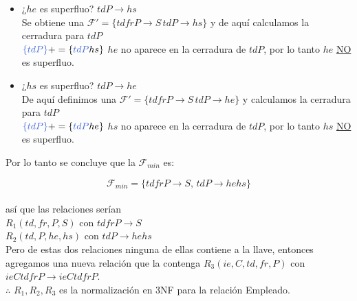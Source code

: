 \documentclass[10pt]{article}
\begin{document}
   	
   	\begin{itemize}
   		\item ¿$he$ es superfluo? $tdP \rightarrow hs$\\
   		Se obtiene una $\mathcal{F'} = \{tdfrP \rightarrow S \,tdP \rightarrow hs\}$ y de aquí calculamos la cerradura para $tdP$\\
   		$\textcolor{RoyalBlue}{\{tdP\}}+= \{\textcolor{RoyalBlue}{tdP}hs\}$
   		$he$ no aparece en la cerradura de $tdP$, por lo tanto $he$ \underline{NO} es superfluo.\\
   		
   		\item ¿$hs$ es superfluo? $tdP \rightarrow he$\\
   		De aquí definimos una $\mathcal{F'} = \{tdfrP \rightarrow S \,tdP \rightarrow he\}$ y calculamos la cerradura para $tdP$\\
   		$\textcolor{RoyalBlue}{\{tdP\}}+= \{\textcolor{RoyalBlue}{tdP}he\}$
   		$hs$ no aparece en la cerradura de $tdP$, por lo tanto $hs$ \underline{NO} es superfluo.\\
   		
   		
   		
   		 
   		
   		
   	\end{itemize}
   
   Por lo tanto se concluye que la $\mathcal{F}_{min}$ es:
   
   \[\mathcal{F}_{min}=\{ tdfrP \rightarrow S,\, tdP \rightarrow hehs\}\]\\
   
   así que las relaciones serían\\
   
   $R_1(td,fr,P,S)$ con $ tdfrP \rightarrow S$  \\
   $R_2(td,P,he,hs)$ con $ tdP \rightarrow hehs $\\
   
   Pero de estas dos relaciones ninguna de ellas contiene a la llave, entonces agregamos una nueva relación que la contenga $R_3(ie,C,td,fr,P)$ con  $ieCtdfrP \rightarrow ieCtdfrP$.\\
   	
   	$\therefore \,\, {R_1, R_2, R_3} $  es la normalización en 3NF para la relación Empleado.
   	
   
\end{document}
